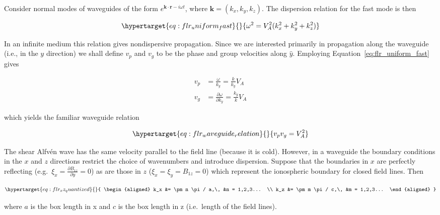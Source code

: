 \documentclass[
  notoc %
]{tufte-book}
\begin{document}
Consider normal modes of waveguides of the form
\(e^{\mathbf{k}\cdot\mathbf{r} - i\omega t}\), where
\(\mathbf{k} = (k_x, k_y, k_z)\). The dispersion relation for the fast
mode is then

\begin{equation}\protect\hypertarget{eq:flr_uniform_fast}{}{
\omega^2 = V_A^2 (k_x^2 + k_y^2 + k_z^2)
}\label{eq:flr_uniform_fast}\end{equation}

In an infinite medium this relation gives nondispersive propagation.
Since we are interested primarily in propagation along the waveguide
(i.e., in the \(y\) direction) we shall define \(v_p\) and \(v_g\) to be
the phase and group velocities along \(\hat{y}\). Employing
Equation~\ref{eq:flr_uniform_fast} gives

\[
\begin{aligned}
v_p &= \frac{\omega}{k_y} = \frac{k}{k_y}V_A \\
v_g &= \frac{\partial\omega}{\partial k_y} = \frac{k_y}{k}V_A
\end{aligned}
\]

which yields the familiar waveguide relation

\begin{equation}\protect\hypertarget{eq:flr_waveguide_relation}{}{
v_p v_g = V_A^2
}\label{eq:flr_waveguide_relation}\end{equation}

The shear Alfvén wave has the same velocity parallel to the field line
(because it is cold). However, in a waveguide the boundary conditions in
the \(x\) and \(z\) directions restrict the choice of wavenumbers and
introduce dispersion. Suppose that the boundaries in \(x\) are perfectly
reflecting (e.g.~\(\xi_x = \frac{\partial B_{1z}}{\partial y} = 0\)) as
are those in \(z\) (\(\xi_x = \xi_y = B_{1z} = 0\)) which represent the
ionospheric boundary for closed field lines. Then

\begin{equation}\protect\hypertarget{eq:flr_xz_quantized}{}{
\begin{aligned}
k_x &= \pm n \pi / a,\, &n = 1,2,3... \\
k_z &= \pm m \pi / c,\, &m = 1,2,3...
\end{aligned}
}\label{eq:flr_xz_quantized}\end{equation}

where \(a\) is the box length in x and \(c\) is the box length in z
(i.e.~length of the field lines).
\end{document}
